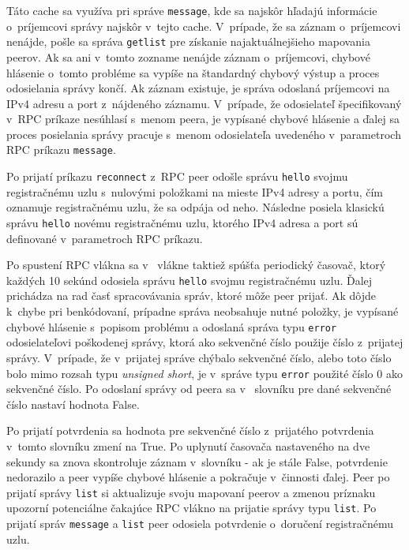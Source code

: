 Táto cache sa využíva pri správe \texttt{message}, kde sa najskôr hľadajú informácie o~príjemcovi správy najskôr v~tejto cache. V~prípade, že sa záznam o~príjemcovi nenájde, pošle sa správa \texttt{getlist} pre získanie najaktuálnejšieho mapovania peerov. Ak sa ani v~tomto zozname nenájde záznam o~príjemcovi, chybové hlásenie o~tomto probléme sa vypíše na štandardný chybový výstup a proces odosielania správy končí. Ak záznam existuje, je správa odoslaná príjemcovi na IPv4 adresu a port z~nájdeného záznamu. V~prípade, že odosielateľ špecifikovaný v~RPC príkaze nesúhlasí s~menom peera, je vypísané chybové hlásenie a ďalej sa proces posielania správy pracuje s~menom odosielateľa uvedeného v~parametroch RPC príkazu \texttt{message}. 

Po prijatí príkazu \texttt{reconnect} z~RPC peer odošle správu \texttt{hello} svojmu registračnému uzlu s~nulovými položkami na mieste IPv4 adresy a portu, čím oznamuje registračnému uzlu, že sa odpája od neho. Následne posiela klasickú správu \texttt{hello} novému registračnému uzlu, ktorého IPv4 adresa a port sú definované v~parametroch RPC príkazu.

Po spustení RPC vlákna sa v~ vlákne taktiež spúšťa periodický časovač, ktorý každých 10 sekúnd odosiela správu \texttt{hello} svojmu registračnému uzlu. Ďalej prichádza na rad časť spracovávania správ, ktoré môže peer prijať. Ak dôjde k~chybe pri benkódovaní, prípadne správa neobsahuje nutné položky, je vypísané chybové hlásenie s~popisom problému a odoslaná správa typu \texttt{error} odosielateľovi poškodenej správy, ktorá ako sekvenčné číslo použije číslo z~prijatej správy. V~prípade, že v~prijatej správe chýbalo sekvenčné číslo, alebo toto číslo bolo mimo rozsah typu \textit{unsigned short}, je v~správe typu \texttt{error} použité číslo 0 ako sekvenčné číslo. Po odoslaní správy od peera sa v~ slovníku pre dané sekvenčné číslo nastaví hodnota False. 

Po prijatí potvrdenia sa hodnota pre sekvenčné číslo z~prijatého potvrdenia v~tomto slovníku zmení na True. Po uplynutí časovača nastaveného na dve sekundy sa znova skontroluje záznam v~slovníku \-- ak je stále False, potvrdenie nedorazilo a peer vypíše chybové hlásenie a pokračuje v~činnosti ďalej. Peer po prijatí správy \texttt{list} si aktualizuje svoju  mapovaní peerov a zmenou príznaku upozorní potenciálne čakajúce RPC vlákno na prijatie správy typu \texttt{list}. Po prijatí správ \texttt{message} a \texttt{list} peer odosiela potvrdenie o~doručení registračnému uzlu.

